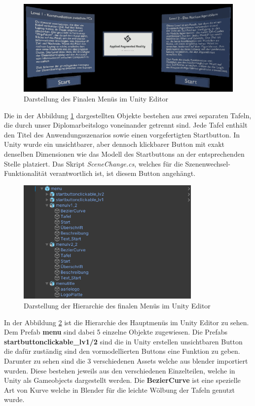 \begin{figure}[H]
    \centering
    \includegraphics[width=1\textwidth]{images/menuversion2.png}
    \caption{Darstellung des Finalen Menüs im Unity Editor}
    \label{fig:menuversion2}
\end{figure}

Die in der Abbildung \ref{fig:menuversion2} dargestellten Objekte bestehen aus zwei separaten Tafeln, die durch unser
Diplomarbeitslogo voneinander getrennt sind. Jede Tafel enthält den Titel des Anwendungsszenarios sowie einen vorgefertigten
Startbutton.  In Unity wurde ein unsichtbarer, aber dennoch klickbarer Button mit exakt denselben Dimensionen wie das
Modell des Startbuttons an der entsprechenden Stelle platziert. Das Skript \textit{SceneChange.cs}, welches für die
Szenenwechsel-Funktionalität verantwortlich ist, ist diesem Button angehängt.

\begin{figure}[H]
    \centering
    \includegraphics[width=0.8\textwidth]{images/hierarchiemenuunity.png}
    \caption{Darstellung der Hierarchie des finalen Menüs im Unity Editor}
    \label{fig:hierarchiemenuunity}
\end{figure}

In der Abbildung \ref{fig:hierarchiemenuunity} ist die Hierarchie des Hauptmenüs im Unity Editor zu sehen. Dem
Prefab \textbf{menu} sind dabei 5 einzelne Objekte zugewiesen. Die Prefabs \textbf{startbuttonclickable\_lv1/2} sind die
in Unity erstellen unsichtbaren Button die dafür zuständig sind den vormodellierten Buttons eine Funktion zu geben. Darunter
zu sehen sind die 3 verschiedenen Assets welche aus blender importiert wurden. Diese bestehen jeweils aus den verschiedenen
Einzelteilen, welche in Unity als Gameobjects dargestellt werden. Die \textbf{BezierCurve} ist eine spezielle Art von Kurve
welche in Blender für die leichte Wölbung der Tafeln genutzt wurde.

